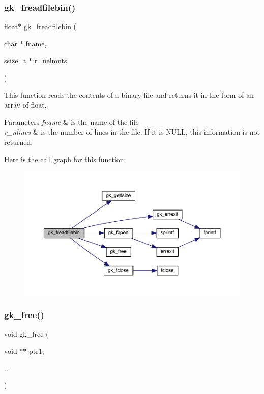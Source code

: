 \subsubsection{\texorpdfstring{gk\+\_\+freadfilebin()}{gk\_freadfilebin()}}
{\footnotesize\ttfamily float$\ast$ gk\+\_\+freadfilebin (\begin{DoxyParamCaption}\item[{char $\ast$}]{fname,  }\item[{ssize\+\_\+t $\ast$}]{r\+\_\+nelmnts }\end{DoxyParamCaption})}

This function reads the contents of a binary file and returns it in the form of an array of float. 
\begin{DoxyParams}{Parameters}
{\em fname} & is the name of the file \\
\hline
{\em r\+\_\+nlines} & is the number of lines in the file. If it is N\+U\+LL, this information is not returned. \\
\hline
\end{DoxyParams}
Here is the call graph for this function\+:\nopagebreak
\begin{figure}[H]
\begin{center}
\leavevmode
\includegraphics[width=350pt]{a00077_a825d4634e2e656bc3dc9f3af0c9b1d5d_cgraph}
\end{center}
\end{figure}
\mbox{\label{a00077_ac8df62c4e3d0910711a9874f9cc58884}} 
\subsubsection{\texorpdfstring{gk\+\_\+free()}{gk\_free()}}
{\footnotesize\ttfamily void gk\+\_\+free (\begin{DoxyParamCaption}\item[{void $\ast$$\ast$}]{ptr1,  }\item[{}]{... }\end{DoxyParamCaption})}

